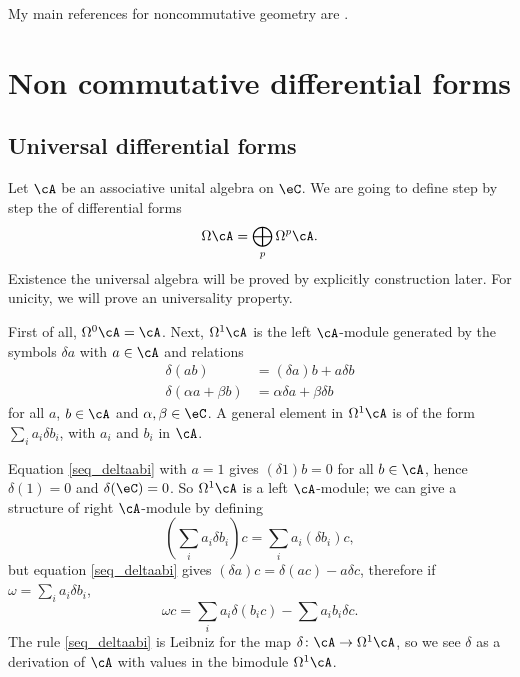 
My main references for noncommutative geometry are \cite{Landi,ConnesNCG,ConnesMotives,itoNCG_Varilly}.

%
\section{Non commutative differential forms}
%

\subsection{Universal differential forms}

Let $\cA$ be an associative unital algebra on $\eC$. We are going to define step by step the  of differential forms 
\[
	\Omega\cA=\bigoplus_p\Omega^p\cA.
\]
Existence the universal algebra will be proved by explicitly construction later. For unicity, we will prove an universality property.

First of all, $\Omega^0\cA=\cA$. Next, $\Omega^1\cA$ is the left $\cA$-module generated by the symbols $\delta a$ with $a\in\cA$ and relations
\begin{subequations}
	\begin{align}
		\delta(ab)               & =(\delta a)b+a\delta b				\label{seq_deltaabi} \\
		\delta(\alpha a+\beta b) & =\alpha\delta a+\beta\delta b
	\end{align}
\end{subequations}
for all $a$, $b\in\cA$ and $\alpha,\beta\in\eC$. A general element in $\Omega^1\cA$ is of the form $\sum_ia_i\delta b_i$, with $a_i$ and $b_i$ in $\cA$.

Equation \eqref{seq_deltaabi} with $a=1$ gives $(\delta 1)b=0$ for all $b\in\cA$, hence $\delta(1)=0$ and $\delta(\eC)=0$. So $\Omega^1\cA$ is a left $\cA$-module; we can give a structure of right $\cA$-module by defining
\[
	(\sum_ia_i\delta b_i)c=\sum_ia_i(\delta b_i)c,
\]
but equation \eqref{seq_deltaabi} gives $(\delta a)c=\delta(ac)-a\delta c$, therefore if $\omega=\sum_ia_i\delta b_i$,
\begin{equation}
	\omega c=\sum_i a_i\delta(b_ic)-\sum a_ib_i\delta c.
\end{equation}
The rule \eqref{seq_deltaabi} is Leibniz for the map $\delta\colon \cA\to \Omega^1\cA$, so we see $\delta$ as a derivation of $\cA$ with values in the bimodule $\Omega^1\cA$.


